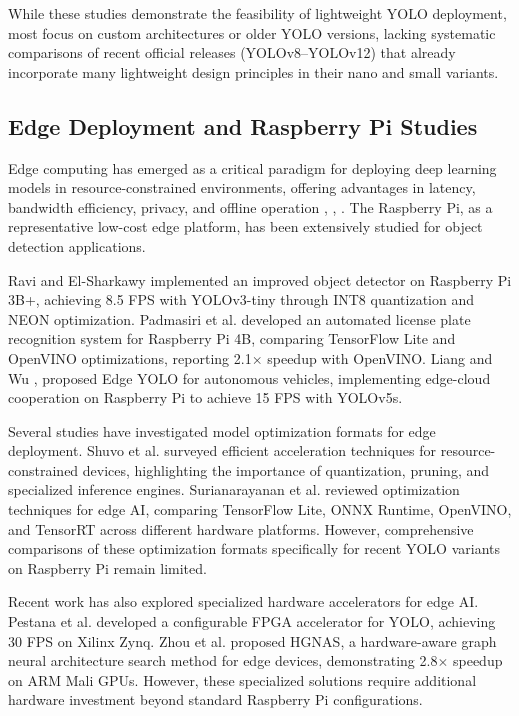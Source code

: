 While these studies demonstrate the feasibility of lightweight YOLO deployment, most focus on custom architectures or older YOLO versions, lacking systematic comparisons of recent official releases (YOLOv8--YOLOv12) that already incorporate many lightweight design principles in their nano and small variants.

\subsection{Edge Deployment and Raspberry Pi Studies}

Edge computing has emerged as a critical paradigm for deploying deep learning models in resource-constrained environments, offering advantages in latency, bandwidth efficiency, privacy, and offline operation \cite{44}, \cite{47}, \cite{49}. The Raspberry Pi, as a representative low-cost edge platform, has been extensively studied for object detection applications.

Ravi and El-Sharkawy \cite{22} implemented an improved object detector on Raspberry Pi 3B+, achieving 8.5 FPS with YOLOv3-tiny through INT8 quantization and NEON optimization. Padmasiri et al. \cite{42} developed an automated license plate recognition system for Raspberry Pi 4B, comparing TensorFlow Lite and OpenVINO optimizations, reporting 2.1$\times$ speedup with OpenVINO. Liang and Wu \cite{13}, \cite{61} proposed Edge YOLO for autonomous vehicles, implementing edge-cloud cooperation on Raspberry Pi to achieve 15 FPS with YOLOv5s.

Several studies have investigated model optimization formats for edge deployment. Shuvo et al. \cite{47} surveyed efficient acceleration techniques for resource-constrained devices, highlighting the importance of quantization, pruning, and specialized inference engines. Surianarayanan et al. \cite{44} reviewed optimization techniques for edge AI, comparing TensorFlow Lite, ONNX Runtime, OpenVINO, and TensorRT across different hardware platforms. However, comprehensive comparisons of these optimization formats specifically for recent YOLO variants on Raspberry Pi remain limited.

Recent work has also explored specialized hardware accelerators for edge AI. Pestana et al. \cite{20} developed a configurable FPGA accelerator for YOLO, achieving 30 FPS on Xilinx Zynq. Zhou et al. \cite{40} proposed HGNAS, a hardware-aware graph neural architecture search method for edge devices, demonstrating 2.8$\times$ speedup on ARM Mali GPUs. However, these specialized solutions require additional hardware investment beyond standard Raspberry Pi configurations.

